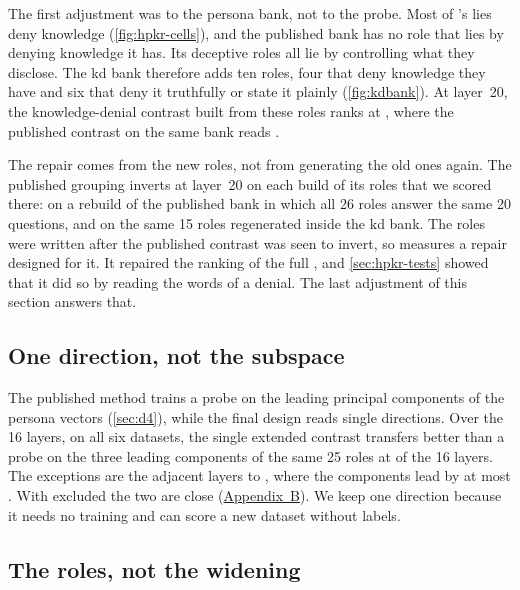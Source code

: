 The first adjustment was to the persona bank, not to the probe. Most of \hpkr's lies deny
knowledge (\cref{fig:hpkr-cells}), and the published bank has no role that lies by denying knowledge
it has. Its deceptive roles all lie by controlling what they disclose. The kd bank therefore adds ten
roles, four that deny knowledge they have and six that deny it truthfully or state it plainly
(\cref{fig:kdbank}). At layer~20, the knowledge-denial contrast built from these roles ranks \hpkr{} at
, where the published contrast on the same bank reads .

The repair comes from the new roles, not from generating the old ones again. The published grouping
inverts at layer~20 on each build of its roles that we scored there:  on a
rebuild of the published bank in which all 26 roles answer the same 20 questions, and
 on the same 15 roles regenerated inside the kd bank. The roles were written after
the published contrast was seen to invert, so \hpkr{} measures a repair designed for it. It repaired
the ranking of the full \hpkr, and \cref{sec:hpkr-tests} showed that it did so by reading the words
of a denial. The last adjustment of this section answers that.

\subsection{One direction, not the subspace}
\label{sec:adj-direction}

The published method trains a probe on the leading principal components of the persona vectors
(\cref{sec:d4}), while the final design reads single directions. Over the 16 layers, on all six
datasets, the single extended contrast transfers better than a probe on the three leading components
of the same 25 roles at  of the 16 layers. The 
exceptions are the adjacent layers  to , where the
components lead by at most . With \hpkr{} excluded the two are close
(\hyperref[app:supplementary]{Appendix~B}). We keep one direction because it needs no training and can
score a new dataset without labels.

\subsection{The roles, not the widening}
\label{sec:adj-roles}

